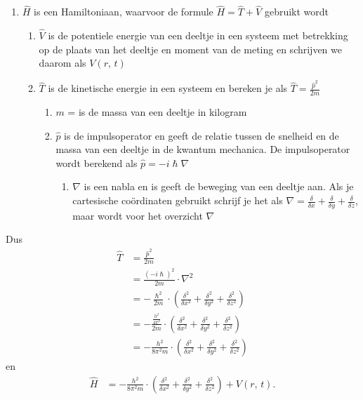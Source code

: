\documentclass[11pt,fleqn]{book} %
\begin{document}
\begin{enumerate}
\begin{enumerate}
\begin{enumerate}
\end{enumerate}
\end{enumerate}
\item $\hat{H}$ is een Hamiltoniaan, waarvoor de formule $\hat{H}=\hat{T}+\hat{V}$ gebruikt wordt
\begin{enumerate}
\item $\hat{V}$ is de potentiele energie van een deeltje in een systeem met betrekking op de plaats van het deeltje en moment van de meting en schrijven we daarom als $V(r,\,t)$
\item $\hat{T}$ is de kinetische energie in een systeem en bereken je als $\hat{T} = \frac{\hat{p}^2}{2m}$
\begin{enumerate}
\item $m$ = is de massa van een deeltje in kilogram
\item $\hat{p}$ is de impulsoperator en geeft de relatie tussen de snelheid en de massa van een deeltje in de kwantum mechanica. De impulsoperator wordt berekend als $\hat{p}=-i\hslash\nabla$
\begin{enumerate}
\item $\nabla$ is een nabla en is geeft de beweging van een deeltje aan. Als je cartesische coördinaten gebruikt schrijf je het als $\nabla = \frac{\delta}{\delta x}+\frac{\delta}{\delta y}+\frac{\delta}{\delta z}$, maar wordt voor het overzicht $\nabla$
\end{enumerate}
\end{enumerate}
\end{enumerate}
\end{enumerate}
Dus
\begin{align*}
\hat{T} &= \frac{\hat{p}^2}{2m}\\
&=\frac{(-i\hslash)^2}{2m}\cdot \nabla^2\\
&=-\frac{\hslash^2}{2m}\cdot \left(\frac{\delta^2}{\delta x^2}+\frac{\delta^2}{\delta y^2}+\frac{\delta^2}{\delta z^2}\right)\\
&= -\frac{\frac{h^2}{4\pi^2}}{2m}\cdot\left(\frac{\delta^2}{\delta x^2}+\frac{\delta^2}{\delta y^2}+\frac{\delta^2}{\delta z^2}\right)\\
&= -\frac{h^2}{8\pi^2m}\cdot\left(\frac{\delta^2}{\delta x^2}+\frac{\delta^2}{\delta y^2}+\frac{\delta^2}{\delta z^2}\right)
\end{align*}
en
\begin{align*}
\hat{H} &=-\frac{h^2}{8\pi^2m}\cdot\left(\frac{\delta^2}{\delta x^2}+\frac{\delta^2}{\delta y^2}+\frac{\delta^2}{\delta z^2}\right)+V(r,\,t).
\end{align*}
\end{document}
